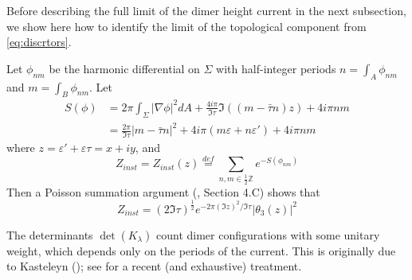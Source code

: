 \documentclass[10pt]{article}
\newcommand{\Z}{\mathbb{Z}}
\newcommand{\eps}{\varepsilon}
\begin{document}
Before describing the full limit of the dimer height current in the next subsection, we show here how to identify the limit of the topological component from \eqref{eq:discrtors}. 

Let $\phi_{nm}$ be the harmonic differential on $\Sigma$ with half-integer periods $n=\int_A\phi_{nm}$ and $m=\int_B\phi_{nm}$. Let
\begin{align*}
S(\phi)&=2\pi\int_\Sigma|\nabla\phi|^2dA+\frac{4i\pi}{\Im\tau}\Im((m-\bar\tau n)z)+4i\pi nm\\
&=\frac{2\pi}{\Im\tau}|m-\bar\tau n|^2+4i\pi(m\eps+n\eps')+4i\pi nm
\end{align*}
where $z=\eps'+\eps\tau=x+iy$, and
\begin{equation}\label{eq:Zinstdef}
Z_{inst}=Z_{inst}(z)\stackrel{def}{=}\sum_{n,m\in\frac 12\Z}e^{-S(\phi_{nm})}
\end{equation}
Then a Poisson summation argument (\cite{ABMNV}, Section 4.C) shows that
\begin{equation}\label{eq:bosonid}
Z_{inst}=(2\Im\tau)^{\frac 12}e^{-2\pi (\Im z)^2/\Im\tau}|\theta_3(z)|^2
\end{equation}

The determinants $\det(K_\lambda)$ count dimer configurations with some unitary weight, which depends only on the periods of the current. This is originally due to Kasteleyn (\cite{Kas_square}); see \cite{CimRes} for a recent (and exhaustive) treatment.
 
\end{document}
